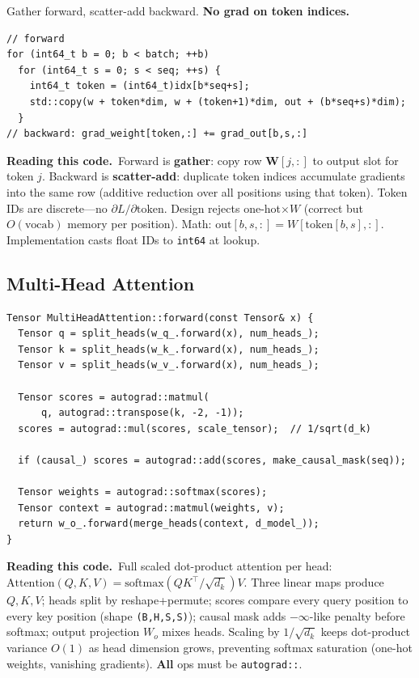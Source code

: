 \documentclass[11pt,a4paper]{article}
\newcommand{\explain}{\par\smallskip\noindent}
\newcommand{\exhead}{\textbf{Reading this code.}\ }
\begin{document}
Gather forward, scatter-add backward. \textbf{No grad on token indices.}

\begin{lstlisting}[style=cpp]
// forward
for (int64_t b = 0; b < batch; ++b)
  for (int64_t s = 0; s < seq; ++s) {
    int64_t token = (int64_t)idx[b*seq+s];
    std::copy(w + token*dim, w + (token+1)*dim, out + (b*seq+s)*dim);
  }
// backward: grad_weight[token,:] += grad_out[b,s,:]
\end{lstlisting}
\explain\exhead Forward is \textbf{gather}: copy row $\mathbf{W}[j,:]$ to output slot for token $j$.
Backward is \textbf{scatter-add}: duplicate token indices accumulate gradients into the same row
(additive reduction over all positions using that token). Token IDs are discrete---no
$\partial L/\partial \text{token}$. Design rejects one-hot$\times W$ (correct but $O(\text{vocab})$
memory per position). Math: $\text{out}[b,s,:] = W[\text{token}[b,s], :]$. Implementation casts
float IDs to \texttt{int64} at lookup.

\subsection{Multi-Head Attention}

\begin{lstlisting}[style=cpp]
Tensor MultiHeadAttention::forward(const Tensor& x) {
  Tensor q = split_heads(w_q_.forward(x), num_heads_);
  Tensor k = split_heads(w_k_.forward(x), num_heads_);
  Tensor v = split_heads(w_v_.forward(x), num_heads_);

  Tensor scores = autograd::matmul(
      q, autograd::transpose(k, -2, -1));
  scores = autograd::mul(scores, scale_tensor);  // 1/sqrt(d_k)

  if (causal_) scores = autograd::add(scores, make_causal_mask(seq));

  Tensor weights = autograd::softmax(scores);
  Tensor context = autograd::matmul(weights, v);
  return w_o_.forward(merge_heads(context, d_model_));
}
\end{lstlisting}
\explain\exhead Full scaled dot-product attention per head:
$\text{Attention}(Q,K,V) = \mathrm{softmax}(QK^\top / \sqrt{d_k}) V$.
Three linear maps produce $Q,K,V$; heads split by reshape+permute; scores compare every query
position to every key position (shape \texttt{(B,H,S,S)}); causal mask adds $-\infty$-like
penalty before softmax; output projection $W_o$ mixes heads. Scaling by $1/\sqrt{d_k}$ keeps
dot-product variance $O(1)$ as head dimension grows, preventing softmax saturation (one-hot
weights, vanishing gradients). \textbf{All} ops must be \texttt{autograd::}.
\end{document}
